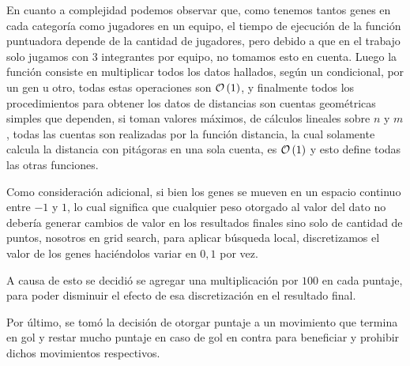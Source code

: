 En cuanto a complejidad podemos observar que, como tenemos tantos genes en cada categoría como jugadores en un
equipo, el tiempo de ejecución de la función puntuadora depende de la cantidad de jugadores,
pero debido a que en el trabajo solo jugamos con 3 integrantes por equipo, no tomamos esto en cuenta.
Luego la función consiste en multiplicar todos los datos hallados, según un condicional, por un gen u otro,
todas estas operaciones son $\mathcal{O}\left(1\right)$, y finalmente todos los procedimientos para obtener los datos de distancias
son cuentas geométricas simples que dependen, si toman valores máximos, de cálculos lineales sobre $n$ y $m$, todas
las cuentas son realizadas por la función distancia, la cual solamente calcula la distancia con pitágoras en una sola
cuenta, es $\mathcal{O}\left(1\right)$ y esto define todas las otras funciones.



Como consideración adicional, si bien los genes se mueven en un espacio continuo entre $-1$ y $1$,
lo cual significa que cualquier peso otorgado al valor del dato no debería generar
cambios de valor en los resultados finales sino solo de cantidad de puntos,
nosotros en grid search, para aplicar búsqueda local, discretizamos el valor de los
genes haciéndolos variar en $0,1$ por vez.


A causa de esto se decidió se agregar una multiplicación por $100$ en cada
puntaje, para poder disminuir el efecto de esa discretización en el resultado final.


Por último, se tomó la decisión de otorgar puntaje a un movimiento que termina
en gol y restar mucho puntaje en caso de gol en contra para beneficiar y
prohibir dichos movimientos respectivos.

